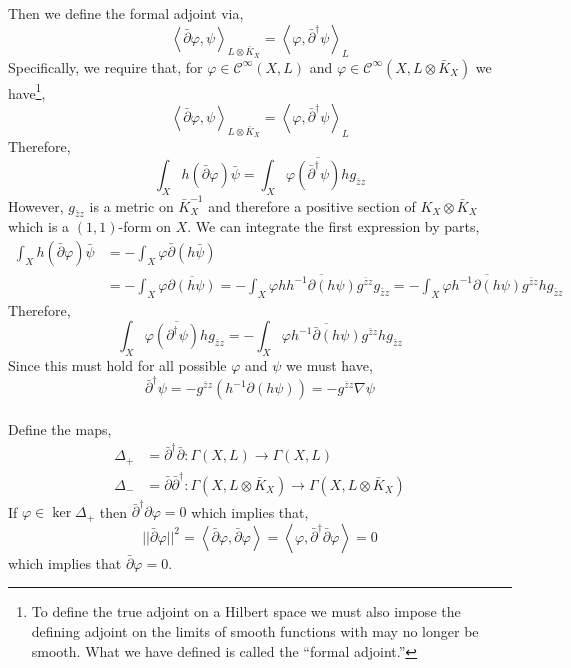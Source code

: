 \documentclass[12pt]{extarticle}
\theoremstyle{definition}
\begin{document}
Then we define the formal adjoint via,
\[ \left< \bar{\partial} \varphi, \psi \right>_{L \otimes \bar{K}_X} = \left< \varphi, \bar{\partial}^\dagger \psi \right>_L \]
Specifically, we require that, for $\varphi \in \mathcal{C}^{\infty}(X, L)$ and $\varphi \in \mathcal{C}^{\infty}(X, L \otimes \bar{K}_X)$ we have\footnote{To define the true adjoint on a Hilbert space we must also impose the defining adjoint on the limits of smooth functions with may no longer be smooth. What we have defined is called the ``formal adjoint.''},
\[ \left< \bar{\partial} \varphi, \psi \right>_{L \otimes \bar{K}_X} = \left< \varphi, \bar{\partial}^\dagger \psi \right>_L \]
Therefore,
\[ \int_X h (\bar{\partial} \varphi) \bar{\psi} = \int_X \varphi \overline{\left( \bar{\partial}^\dagger \psi \right)} h g_{\bar{z} z} \]
However, $g_{\bar{z} z}$ is a metric on $\bar{K}_X^{-1}$ and therefore a positive section of $K_X \otimes \bar{K}_X$ which is a $(1,1)$-form on $X$. 
We can integrate the first expression by parts,
\begin{align*}
\int_X h (\bar{\partial} \varphi) \bar{\psi} & = - \int_X \varphi \bar{\partial} \left( h \bar{\psi} \right) 
\\
& = - \int_X \varphi \overline{ \partial \left( h \psi \right)} = - \int_X \varphi  h \overline{h^{-1} \partial ( h \psi)} g^{\bar{z} z} g_{\bar{z} z} 
= - \int_X \varphi  \overline{h^{-1} \partial ( h \psi)} g^{\bar{z} z} h g_{\bar{z} z} 
\end{align*}
Therefore,
\[ \int_X \varphi  \overline{\left( \partial^\dagger \psi \right)} h g_{\bar{z} z} = - \int_X \varphi  \overline{h^{-1} \bar{\partial} ( h \psi)} g^{\bar{z} z} h g_{\bar{z} z} \]
Since this must hold for all possible $\varphi$ and $\psi$ we must have,
\[ \bar{\partial}^\dagger \psi = - g^{\bar{z} z} \left( h^{-1} \partial (h \psi) \right) = - g^{\bar{z} z} \nabla \psi \]
\bigskip\\
Define the maps,
\begin{align*}
\Delta_+ & = \bar{\partial}^\dagger \bar{\partial} : \Gamma(X, L) \to \Gamma(X, L)
\\
\Delta_{-} & = \bar{\partial} \bar{\partial}^\dagger : \Gamma(X, L \otimes \bar{K}_X) \to \Gamma(X, L \otimes \bar{K}_X)
\end{align*} 
If $\varphi \in \ker{\Delta_{+}}$ then $\bar{\partial}^\dagger \partial \varphi = 0$ which implies that,
\[ || \bar{\partial} \varphi ||^2 = \left< \bar{\partial} \varphi, \bar{\partial} \varphi \right> = \left<  \varphi, \bar{\partial}^\dagger \bar{\partial} \varphi \right> = 0 \]
which implies that $\bar{\partial} \varphi = 0$.
\end{document}
